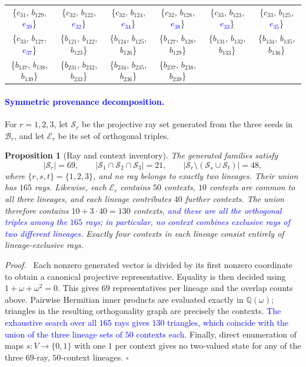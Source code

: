 \documentclass[%
  reprint,
  superscriptaddress,
  showkeys,
  amsmath,amssymb,
  aps,pra,
  longbibliography,
  floatfix,
  x11names
]{revtex4-2}
\DeclareRobustCommand{\chg}[1]{\textcolor{blue}{#1}}
\newtheorem{proposition}{Proposition}
\newenvironment{proof}{\par\noindent\textit{Proof.}\ }{\hfill$\square$\par}
\begin{document}
\begin{table}[htbp!]
\begin{ruledtabular}
\begin{tabular}{*{6}{c}}
\{$c_{31}$, $b_{129}$, \chg{$e_{39}$}\} & \{$c_{32}$, $b_{122}$, \chg{$e_{32}$}\} & \{$c_{32}$, $b_{124}$, \chg{$e_{34}$}\} & \{$c_{32}$, $b_{128}$, \chg{$e_{38}$}\} & \{$c_{33}$, $b_{123}$, \chg{$e_{33}$}\} & \{$c_{33}$, $b_{125}$, \chg{$e_{35}$}\} \\
\{$c_{33}$, $b_{127}$, \chg{$e_{37}$}\} & \{$b_{121}$, $b_{122}$, $b_{123}$\} & \{$b_{124}$, $b_{125}$, $b_{126}$\} & \{$b_{127}$, $b_{128}$, $b_{129}$\} & \{$b_{131}$, $b_{132}$, $b_{133}$\} & \{$b_{134}$, $b_{135}$, $b_{136}$\} \\
\{$b_{137}$, $b_{138}$, $b_{139}$\} & \{$b_{231}$, $b_{232}$, $b_{233}$\} & \{$b_{234}$, $b_{235}$, $b_{236}$\} & \{$b_{237}$, $b_{238}$, $b_{239}$\} & & \\
\end{tabular}
\end{ruledtabular}
\end{table}

\paragraph*{\chg{Symmetric provenance decomposition.}}

For $r=1,2,3$, let $\mathcal{S}_r$ be the projective ray set generated from the three seeds in $\mathcal{B}_r$, and let $\mathcal{E}_r$ be its set of orthogonal triples.

\begin{proposition}[Ray and context inventory]
\label{prop:provenance}
The generated families satisfy
\[
|\mathcal{S}_r|=69,\qquad
|\mathcal{S}_1\cap\mathcal{S}_2\cap\mathcal{S}_3|=21,
\qquad |\mathcal{S}_r\setminus(\mathcal{S}_s\cup\mathcal{S}_t)|=48,
\]
where $\{r,s,t\}=\{1,2,3\}$, and no ray belongs to exactly two lineages.  Their union has $165$
rays.  Likewise, each $\mathcal{E}_r$ contains $50$ contexts, $10$ contexts are common to all three lineages, and each lineage contributes $40$ further contexts.  The union therefore contains $10+3\cdot40=130$ contexts\chg{, and these are all the orthogonal triples among the $165$ rays; in particular, no context combines exclusive rays of two different lineages}.  Exactly four contexts in each lineage consist entirely of lineage-exclusive rays.
\end{proposition}

\begin{proof}
Each nonzero generated vector is divided by its first nonzero coordinate to obtain a canonical projective representative.  Equality is then decided using $1+\omega+\omega^2=0$.  This gives $69$ representatives per lineage and the overlap counts above.  Pairwise Hermitian inner products are evaluated exactly in $\mathbb{Q}(\omega)$; triangles in the resulting orthogonality graph are precisely the contexts.  \chg{The exhaustive search over all $165$ rays gives $130$ triangles, which coincide with the union of the three lineage sets of $50$ contexts each.}  Finally, direct enumeration of maps $s:V\to\{0,1\}$ with one $1$ per context gives no two-valued state for any of the three $69$-ray, $50$-context lineages.
\end{proof}
\end{document}
